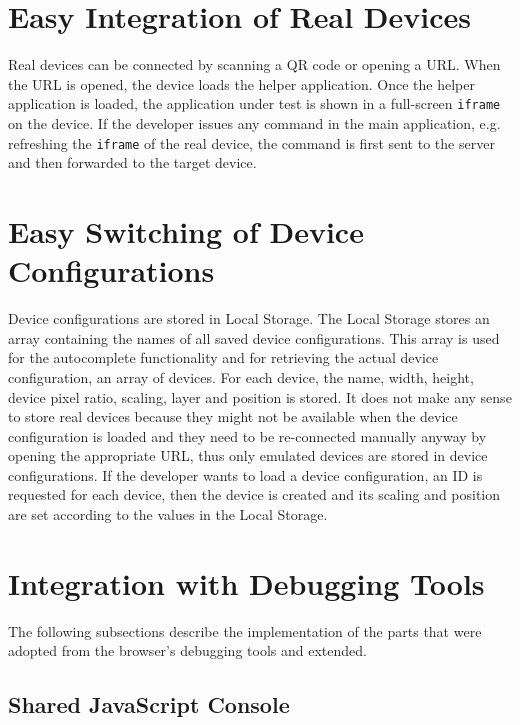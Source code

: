 \section{Easy Integration of Real Devices}

Real devices can be connected by scanning a QR code or opening a URL. When the URL is opened, the device loads the helper application. Once the helper application is loaded, the application under test is shown in a full-screen \lstinline|iframe| on the device. If the developer issues any command in the main application, e.g. refreshing the \lstinline|iframe| of the real device, the command is first sent to the server and then forwarded to the target device. 

\section{Easy Switching of Device Configurations}

Device configurations are stored in Local Storage. The Local Storage stores an array containing the names of all saved device configurations. This array is used for the autocomplete functionality and for retrieving the actual device configuration, an array of devices. For each device, the name, width, height, device pixel ratio, scaling, layer and position is stored. It does not make any sense to store real devices because they might not be available when the device configuration is loaded and they need to be re-connected manually anyway by opening the appropriate URL, thus only emulated devices are stored in device configurations. If the developer wants to load a device configuration, an ID is requested for each device, then the device is created and its scaling and position are set according to the values in the Local Storage.

\section{Integration with Debugging Tools}

The following subsections describe the implementation of the parts that were adopted from the browser's debugging tools and extended.

\subsection{Shared JavaScript Console}

